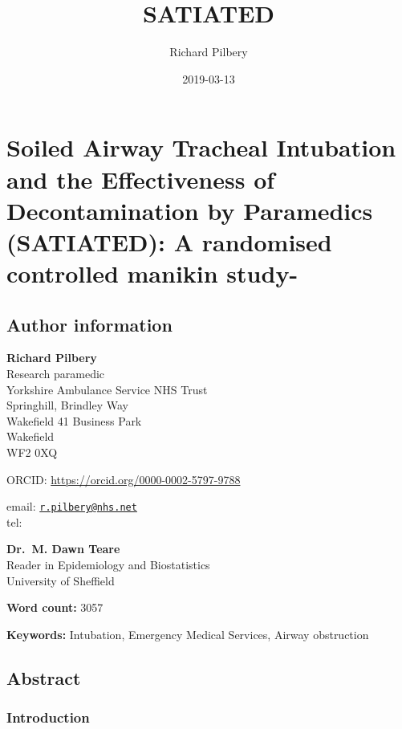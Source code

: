 \documentclass[]{article}
\title{SATIATED}
\author{Richard Pilbery}
\date{2019-03-13}
\begin{document}
\maketitle

\hypertarget{soiled-airway-tracheal-intubation-and-the-effectiveness-of-decontamination-by-paramedics-satiated-a-randomised-controlled-manikin-study-}{%
\section{Soiled Airway Tracheal Intubation and the Effectiveness of
Decontamination by Paramedics (SATIATED): A randomised controlled
manikin
study-}\label{soiled-airway-tracheal-intubation-and-the-effectiveness-of-decontamination-by-paramedics-satiated-a-randomised-controlled-manikin-study-}}

\hypertarget{author-information}{%
\subsection{Author information}\label{author-information}}

\textbf{Richard Pilbery}\\
Research paramedic\\
Yorkshire Ambulance Service NHS Trust\\
Springhill, Brindley Way\\
Wakefield 41 Business Park\\
Wakefield\\
WF2 0XQ

ORCID: \url{https://orcid.org/0000-0002-5797-9788}

email: \href{mailto:r.pilbery@nhs.net}{\nolinkurl{r.pilbery@nhs.net}}\\
tel:

\textbf{Dr.~M. Dawn Teare}\\
Reader in Epidemiology and Biostatistics\\
University of Sheffield

\textbf{Word count:} 3057

\textbf{Keywords:} Intubation, Emergency Medical Services, Airway
obstruction

\hypertarget{abstract}{%
\subsection{Abstract}\label{abstract}}

\hypertarget{introduction}{%
\subsubsection{Introduction}\label{introduction}}
\end{document}
